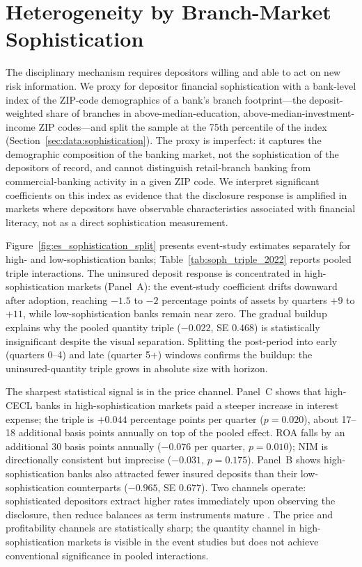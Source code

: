 \section{Heterogeneity by Branch-Market Sophistication}
\label{sec:heterogeneity}
\label{sec:results:sophistication}
\label{sec:results:heterogeneity}

The disciplinary mechanism requires depositors willing and able to act
on new risk information.  We proxy for depositor financial
sophistication with a bank-level index of the ZIP-code demographics of
a bank's branch footprint---the deposit-weighted share of branches in
above-median-education, above-median-investment-income ZIP codes---and
split the sample at the 75th percentile of the index
(Section~\ref{sec:data:sophistication}).  The proxy is imperfect: it
captures the demographic composition of the banking market, not the
sophistication of the depositors of record, and cannot distinguish
retail-branch banking from commercial-banking activity in a given
ZIP code.  We interpret significant coefficients on this index as
evidence that the disclosure response is amplified in markets where
depositors have observable characteristics associated with financial
literacy, not as a direct sophistication measurement.

Figure~\ref{fig:es_sophistication_split} presents event-study estimates
separately for high- and low-sophistication banks;
Table~\ref{tab:soph_triple_2022} reports pooled triple interactions.
The uninsured deposit response is concentrated in high-sophistication
markets (Panel~A): the event-study coefficient drifts downward after
adoption, reaching $-1.5$ to $-2$ percentage points of assets by
quarters $+9$ to $+11$, while low-sophistication banks remain near zero.
The gradual buildup explains why the pooled quantity triple
($-0.022$, SE $0.468$) is statistically insignificant despite the visual
separation.  Splitting the post-period into early (quarters 0--4) and
late (quarter 5+) windows confirms the buildup: the uninsured-quantity
triple grows in absolute size with horizon.

The sharpest statistical signal is in the price channel.  Panel~C shows
that high-CECL banks in high-sophistication markets paid a steeper
increase in interest expense; the triple is $+0.044$ percentage points
per quarter ($p=0.020$), about 17--18 additional basis points annually
on top of the pooled effect.  ROA falls by an additional 30 basis points
annually ($-0.076$ per quarter, $p=0.010$); NIM is directionally
consistent but imprecise ($-0.031$, $p=0.175$).  Panel~B shows
high-sophistication banks also attracted fewer insured deposits than
their low-sophistication counterparts ($-0.965$, SE $0.677$).  Two
channels operate: sophisticated depositors extract higher rates
immediately upon observing the disclosure, then reduce balances as term
instruments mature \citep{egan2017deposit}.  The price and profitability
channels are statistically sharp; the quantity channel in
high-sophistication markets is visible in the event studies but does
not achieve conventional significance in pooled interactions.

